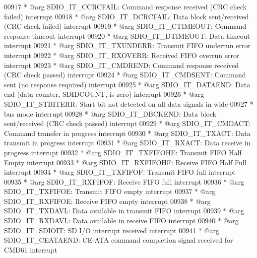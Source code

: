 \begin{DoxyCode}
00917 \textcolor{comment}{  *            @arg SDIO\_IT\_CCRCFAIL: Command response received (CRC check failed) interrupt}
00918 \textcolor{comment}{  *            @arg SDIO\_IT\_DCRCFAIL: Data block sent/received (CRC check failed) interrupt}
00919 \textcolor{comment}{  *            @arg SDIO\_IT\_CTIMEOUT: Command response timeout interrupt}
00920 \textcolor{comment}{  *            @arg SDIO\_IT\_DTIMEOUT: Data timeout interrupt}
00921 \textcolor{comment}{  *            @arg SDIO\_IT\_TXUNDERR: Transmit FIFO underrun error interrupt}
00922 \textcolor{comment}{  *            @arg SDIO\_IT\_RXOVERR:  Received FIFO overrun error interrupt}
00923 \textcolor{comment}{  *            @arg SDIO\_IT\_CMDREND:  Command response received (CRC check passed) interrupt}
00924 \textcolor{comment}{  *            @arg SDIO\_IT\_CMDSENT:  Command sent (no response required) interrupt}
00925 \textcolor{comment}{  *            @arg SDIO\_IT\_DATAEND:  Data end (data counter, SDIDCOUNT, is zero) interrupt}
00926 \textcolor{comment}{  *            @arg SDIO\_IT\_STBITERR: Start bit not detected on all data signals in wide }
00927 \textcolor{comment}{  *                                   bus mode interrupt}
00928 \textcolor{comment}{  *            @arg SDIO\_IT\_DBCKEND:  Data block sent/received (CRC check passed) interrupt}
00929 \textcolor{comment}{  *            @arg SDIO\_IT\_CMDACT:   Command transfer in progress interrupt}
00930 \textcolor{comment}{  *            @arg SDIO\_IT\_TXACT:    Data transmit in progress interrupt}
00931 \textcolor{comment}{  *            @arg SDIO\_IT\_RXACT:    Data receive in progress interrupt}
00932 \textcolor{comment}{  *            @arg SDIO\_IT\_TXFIFOHE: Transmit FIFO Half Empty interrupt}
00933 \textcolor{comment}{  *            @arg SDIO\_IT\_RXFIFOHF: Receive FIFO Half Full interrupt}
00934 \textcolor{comment}{  *            @arg SDIO\_IT\_TXFIFOF:  Transmit FIFO full interrupt}
00935 \textcolor{comment}{  *            @arg SDIO\_IT\_RXFIFOF:  Receive FIFO full interrupt}
00936 \textcolor{comment}{  *            @arg SDIO\_IT\_TXFIFOE:  Transmit FIFO empty interrupt}
00937 \textcolor{comment}{  *            @arg SDIO\_IT\_RXFIFOE:  Receive FIFO empty interrupt}
00938 \textcolor{comment}{  *            @arg SDIO\_IT\_TXDAVL:   Data available in transmit FIFO interrupt}
00939 \textcolor{comment}{  *            @arg SDIO\_IT\_RXDAVL:   Data available in receive FIFO interrupt}
00940 \textcolor{comment}{  *            @arg SDIO\_IT\_SDIOIT:   SD I/O interrupt received interrupt}
00941 \textcolor{comment}{  *            @arg SDIO\_IT\_CEATAEND: CE-ATA command completion signal received for CMD61 interrupt}

\end{DoxyCode}
